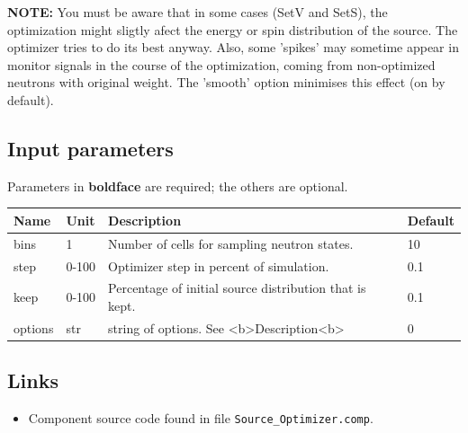 \textbf{NOTE:} You must be aware that in some cases (SetV and SetS), the optimization might sligtly afect the energy or spin distribution of the source. The optimizer tries to do its best anyway. Also, some 'spikes' may sometime appear in monitor signals in the course of the optimization, coming from non-optimized neutrons with original weight. The 'smooth' option minimises this effect (on by default).

\subsection*{Input parameters}
Parameters in \textbf{boldface} are required; the others are optional.

\begin{longtable}{p{}p{}p{}p{}}
\toprule
\textbf{Name} & \textbf{Unit} & \textbf{Description} & \textbf{Default} \\
\midrule
\endhead
bins & 1 & Number of cells for sampling neutron states. & 10 \\
step & 0-100 & Optimizer step in percent of simulation. & 0.1 \\
keep & 0-100 & Percentage of initial source distribution that is kept. & 0.1 \\
options & str & string of options. See \textless{}b\textgreater{}Description\textless{}b\textgreater{} & 0 \\
\bottomrule
\end{longtable}

\subsection*{Links}
\begin{itemize}
  \item Component source code found in file \texttt{Source\_Optimizer.comp}.
\end{itemize}

